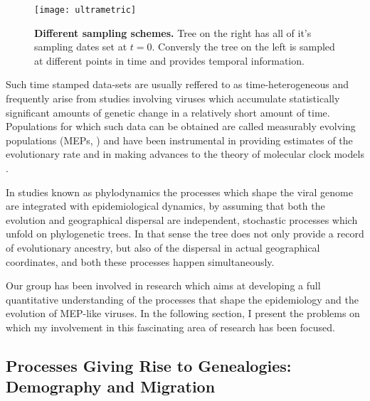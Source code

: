 
\begin{figure}[H]
\centering
\texttt{[image: ultrametric]} 
\caption{
{ \footnotesize 
{\bf Different sampling schemes.} Tree on the right has all of it's sampling dates set at $t=0$. Conversly the tree on the left is sampled at different points in time and provides temporal information.
}%
}
\label{fig:ultrametric}
\end{figure}

Such time stamped data-sets are usually reffered to as time-heterogeneous and frequently arise from studies involving viruses which accumulate statistically significant amounts of genetic change in a relatively short amount of time.
Populations for which such data can be obtained are called measurably evolving populations (MEPs, \cite{Drummond2003}) and have been instrumental in providing estimates of the evolutionary rate and in making advances to the theory of molecular clock models \citep{Drummond2006}.

In studies known as phylodynamics the processes which shape the viral genome are integrated with epidemiological dynamics, by assuming that both the evolution and 
geographical dispersal are independent, stochastic processes which unfold on phylogenetic trees.
In that sense the tree does not only provide a record of evolutionary ancestry, but also of the dispersal in actual geographical coordinates, and both these processes happen simultaneously.

Our group has been involved in research which aims at developing a full quantitative understanding of the processes that shape the epidemiology and the evolution of MEP-like viruses.
In the following section, I present the problems on which my involvement in this fascinating area of research has been focused.


\subsection{Processes Giving Rise to Genealogies: Demography and Migration}


